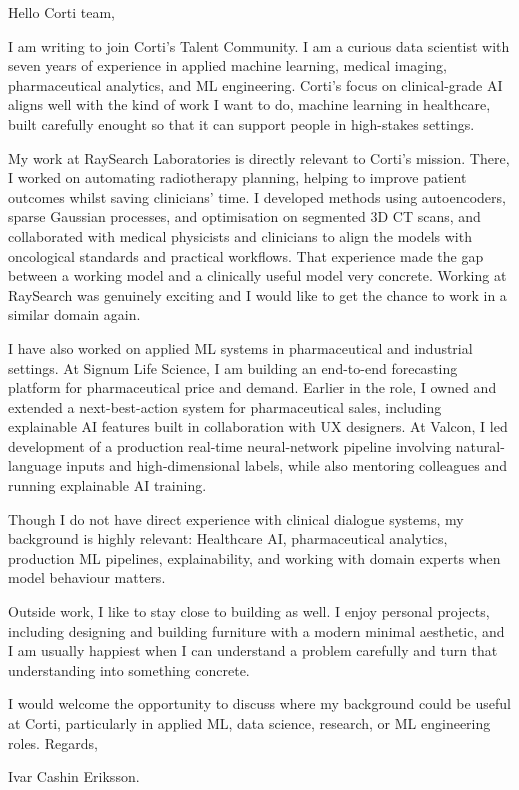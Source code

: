 \documentclass[11pt,a4paper]{moderncv}
\begin{document}
\makecvtitle
Hello Corti team,

\vspace*{2em}
I am writing to join Corti's Talent Community. I am a curious data scientist with seven years of experience in applied machine learning, medical imaging, pharmaceutical analytics, and ML engineering. Corti's focus on clinical-grade AI aligns well with the kind of work I want to do, machine learning in healthcare, built carefully enought so that it can support people in high-stakes settings.

\hspace*{2em}
My work at RaySearch Laboratories is directly relevant to Corti's mission. There, I worked on automating radiotherapy planning, helping to improve patient outcomes whilst saving clinicians' time. I developed methods using autoencoders, sparse Gaussian processes, and optimisation on segmented 3D CT scans, and collaborated with medical physicists and clinicians to align the models with oncological standards and practical workflows. That experience made the gap between a working model and a clinically useful model very concrete. Working at RaySearch was genuinely exciting and I would like to get the chance to work in a similar domain again.

\hspace*{2em}
I have also worked on applied ML systems in pharmaceutical and industrial settings. At Signum Life Science, I am building an end-to-end forecasting platform for pharmaceutical price and demand. Earlier in the role, I owned and extended a next-best-action system for pharmaceutical sales, including explainable AI features built in collaboration with UX designers. At Valcon, I led development of a production real-time neural-network pipeline involving natural-language inputs and high-dimensional labels, while also mentoring colleagues and running explainable AI training.

\hspace*{2em}
Though I do not have direct experience with clinical dialogue systems, my background is highly relevant: Healthcare AI, pharmaceutical analytics, production ML pipelines, explainability, and working with domain experts when model behaviour matters.

\hspace*{2em}
Outside work, I like to stay close to building as well. I enjoy personal projects, including designing and building furniture with a modern minimal aesthetic, and I am usually happiest when I can understand a problem carefully and turn that understanding into something concrete.

\vspace*{2em}
I would welcome the opportunity to discuss where my background could be useful at Corti, particularly in applied ML, data science, research, or ML engineering roles. Regards,

\vspace*{1em}
Ivar Cashin Eriksson.
\end{document}
